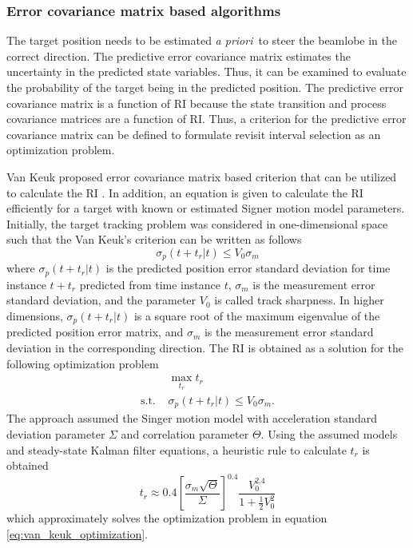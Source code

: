 \documentclass[english, 12pt, a4paper, elec, utf8, a-1b, online]{aaltothesis}
\def\prior{\textit{a priori}\ }
\begin{document}
\subsubsection{Error covariance matrix based algorithms}


The target position needs to be estimated \prior to steer the beamlobe in the correct direction. 
The predictive error covariance matrix estimates the uncertainty in the predicted state variables.
Thus, it can be examined to evaluate the probability of the target being in the predicted position.
The predictive error covariance matrix is a function of RI because the state transition and process covariance matrices are a function of RI.
Thus, a criterion for the predictive error covariance matrix can be defined to formulate revisit interval selection as an optimization problem.

Van Keuk proposed error covariance matrix based criterion that can be utilized to calculate the RI \cite{Keuk1975}.
In addition, an equation is given to calculate the RI efficiently for a target with known or estimated Signer motion model \cite{RongLi2003} parameters.
Initially, the target tracking problem was considered in one-dimensional space such that the Van Keuk's criterion can be written as follows
\begin{equation}\label{eq:criterion}
    \sigma_p(t + t_r | t) \leq V_0 \sigma_m
\end{equation}
where $\sigma_p(t + t_r | t)$ is the predicted position error standard deviation for time instance $t+t_r$ predicted from time instance $t$, $\sigma_m$ is the measurement error standard deviation, and the parameter $V_0$ is called track sharpness.
In higher dimensions, $\sigma_p(t + t_r | t)$ is a square root of the maximum eigenvalue of the predicted position error matrix, and $\sigma_m$ is the measurement error standard deviation in the corresponding direction.
The RI is obtained as a solution for the following optimization problem
\begin{equation}\label{eq:van_keuk_optimization}
\begin{array}{ll}
     & \max_{t_r} t_r \\[7pt]
    \text{s.t. } &\sigma_p(t + t_r | t) \leq V_0 \sigma_m. 
\end{array}
\end{equation}
The approach assumed the Singer motion model with acceleration standard deviation parameter $\Sigma$ and correlation parameter $\Theta$.
Using the assumed models and steady-state Kalman filter equations, a heuristic rule to calculate $t_r$ is obtained
\begin{equation}\label{eq:keuk_time}
    t_r \approx 0.4 \left[ \frac{\sigma_m \sqrt{\Theta}}{\Sigma} \right]^{0.4} \frac{V_0^{2.4}}{1+\frac{1}{2}V_0^2}
\end{equation}
which approximately solves the optimization problem in equation \eqref{eq:van_keuk_optimization}.
\end{document}
